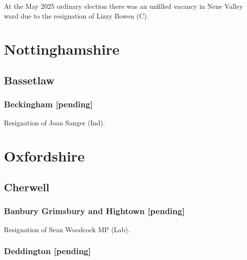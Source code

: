 \documentclass[a4paper,openany]{book}
\begin{document}
\begin{resultsiii}
At the May 2025 ordinary election there was an unfilled vacancy in Nene Valley ward due to the resignation of Lizzy Bowen (C).%

\section{Nottinghamshire}

\subsection*{Bassetlaw}

\subsubsection*{Beckingham \hspace*{\fill}\nolinebreak[1]%
	\enspace\hspace*{\fill}
	[pending]}


Resignation of Joan Sanger (Ind).

\section{Oxfordshire}

\subsection*{Cherwell}

\subsubsection*{Banbury Grimsbury and Hightown \hspace*{\fill}\nolinebreak[1]%
	\enspace\hspace*{\fill}
	[pending]}


Resignation of Sean Woodcock MP (Lab).

\subsubsection*{Deddington \hspace*{\fill}\nolinebreak[1]%
	\enspace\hspace*{\fill}
	[pending]}


\end{resultsiii}
\end{document}
